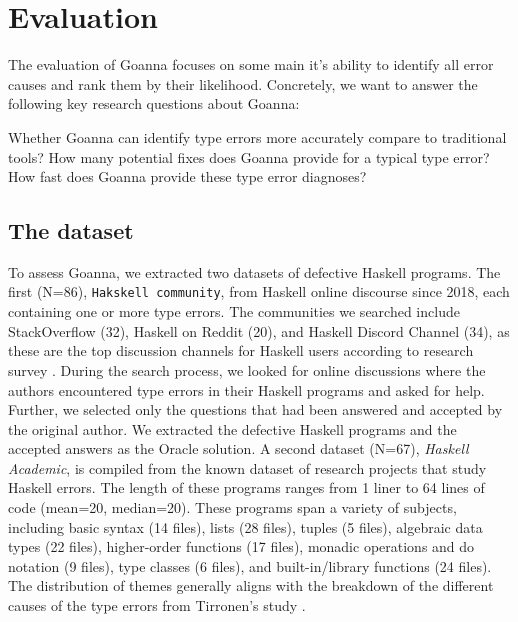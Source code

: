 \documentclass[pdflatex,sn-mathphys-num]{sn-jnl}%
\begin{document}
    \section{Evaluation} \label{sec:evaluation}
    The evaluation of Goanna focuses on some main it's ability to identify all error causes and rank them by their likelihood. Concretely, we want to answer the following key research questions about Goanna:

    Whether Goanna can identify type errors more accurately compare to traditional tools?
    How many potential fixes does Goanna provide for a typical type error?
    How fast does Goanna provide these type error diagnoses?
    
    \subsection{The dataset} \label{sub:dataset}   
    To assess Goanna, we extracted two datasets of defective Haskell programs. 
 The first (N=86), \texttt{Hakskell community},  from Haskell online discourse since 2018, each containing one or more type errors. The communities we searched include StackOverflow (32), Haskell on Reddit (20), and Haskell Discord Channel (34), as these are the top discussion channels for Haskell users according to research survey \cite{Fausak2022-zf}. During the search process, we looked for online discussions where the authors encountered type errors in their Haskell programs and asked for help. Further, we selected only the questions that had been answered and accepted by the original author.  We extracted the defective Haskell programs and the accepted answers as the Oracle solution. A second dataset (N=67), \textit{Haskell Academic}, is compiled from the known dataset of research projects that study Haskell errors. The length of these programs ranges from 1 liner to 64 lines of code (mean=20, median=20). These programs span a variety of subjects, including basic syntax (14 files), lists (28 files), tuples (5 files), algebraic data types (22 files), higher-order functions (17 files), monadic operations and do notation (9 files), type classes (6 files), and built-in/library functions (24 files). The distribution of themes generally aligns with the breakdown of the different causes of the type errors from Tirronen's study \cite{Tirronen2015-nr}.  
    
\end{document}
